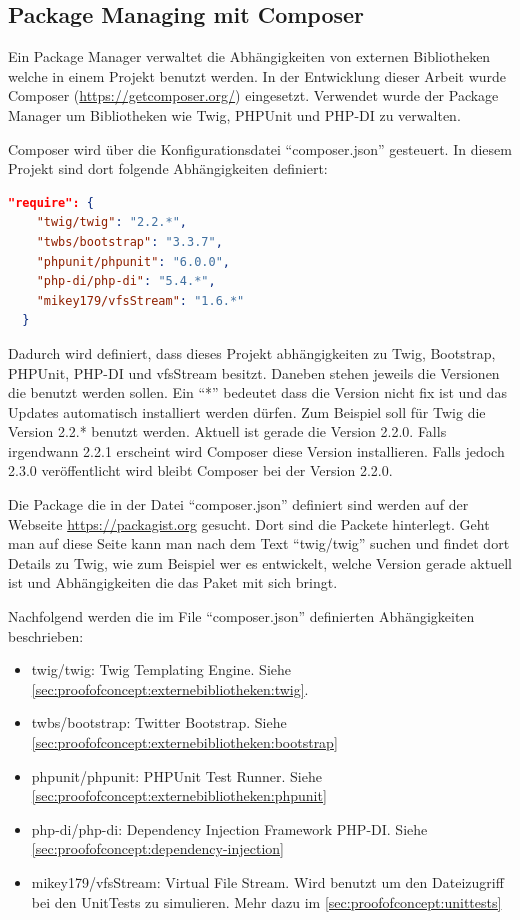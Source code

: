 \subsection{Package Managing mit Composer}
Ein Package Manager verwaltet die Abhängigkeiten von externen Bibliotheken welche in einem Projekt benutzt werden. In der Entwicklung dieser Arbeit wurde Composer (\url{https://getcomposer.org/}) eingesetzt. Verwendet wurde der Package Manager um Bibliotheken wie Twig, PHPUnit und PHP-DI zu verwalten.

Composer wird über die Konfigurationsdatei "`composer.json"' gesteuert. In diesem Projekt sind dort folgende Abhängigkeiten definiert:

\begin{lstlisting}[language=json]
  "require": {
    "twig/twig": "2.2.*",
    "twbs/bootstrap": "3.3.7",
    "phpunit/phpunit": "6.0.0",
    "php-di/php-di": "5.4.*",
    "mikey179/vfsStream": "1.6.*"
  }
\end{lstlisting}

Dadurch wird definiert, dass dieses Projekt abhängigkeiten zu Twig, Bootstrap, PHPUnit, PHP-DI und vfsStream besitzt. Daneben stehen jeweils die Versionen die benutzt werden sollen. Ein "`*"' bedeutet dass die Version nicht fix ist und das Updates automatisch installiert werden dürfen. Zum Beispiel soll für Twig die Version 2.2.* benutzt werden. Aktuell ist gerade die Version 2.2.0. Falls irgendwann 2.2.1 erscheint wird Composer diese Version installieren. Falls jedoch 2.3.0 veröffentlicht wird bleibt Composer bei der Version 2.2.0. 

Die Package die in der Datei "`composer.json"' definiert sind werden auf der Webseite \url{https://packagist.org} gesucht. Dort sind die Packete hinterlegt. Geht man auf diese Seite kann man nach dem Text "`twig/twig"' suchen und findet dort Details zu Twig, wie zum Beispiel wer es entwickelt, welche Version gerade aktuell ist und Abhängigkeiten die das Paket mit sich bringt.

Nachfolgend werden die im File "`composer.json"' definierten Abhängigkeiten beschrieben:
\begin{itemize}
	\item twig/twig: Twig Templating Engine. Siehe \cref{sec:proofofconcept:externebibliotheken:twig}.
	\item twbs/bootstrap: Twitter Bootstrap. Siehe \cref{sec:proofofconcept:externebibliotheken:bootstrap}
	\item phpunit/phpunit: PHPUnit Test Runner. Siehe \cref{sec:proofofconcept:externebibliotheken:phpunit}
	\item php-di/php-di: Dependency Injection Framework PHP-DI. Siehe \cref{sec:proofofconcept:dependency-injection}
	\item mikey179/vfsStream: Virtual File Stream. Wird benutzt um den Dateizugriff bei den UnitTests zu simulieren. Mehr dazu im \cref{sec:proofofconcept:unittests} 
\end{itemize}

